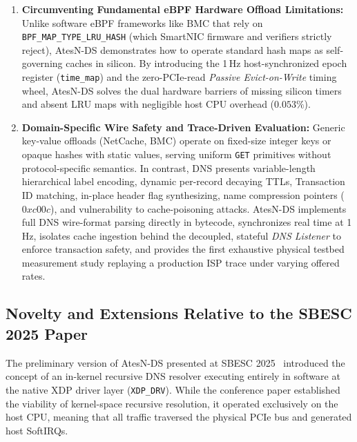 \documentclass[a4paper,fleqn,colorlinks,hidelinks]{cas-sc}
\begin{document}
\begin{enumerate}
    \item \textbf{Circumventing Fundamental eBPF Hardware Offload Limitations:} Unlike software eBPF frameworks like BMC that rely on \texttt{BPF\_MAP\_TYPE\_LRU\_HASH} (which SmartNIC firmware and verifiers strictly reject), AtesN-DS demonstrates how to operate standard hash maps as self-governing caches in silicon. By introducing the 1\,Hz host-synchronized epoch register (\texttt{time\_map}) and the zero-PCIe-read \textit{Passive Evict-on-Write} timing wheel, AtesN-DS solves the dual hardware barriers of missing silicon timers and absent LRU maps with negligible host CPU overhead ($0.053\%$).
    \item \textbf{Domain-Specific Wire Safety and Trace-Driven Evaluation:} Generic key-value offloads (NetCache, BMC) operate on fixed-size integer keys or opaque hashes with static values, serving uniform \texttt{GET} primitives without protocol-specific semantics. In contrast, DNS presents variable-length hierarchical label encoding, dynamic per-record decaying TTLs, Transaction ID matching, in-place header flag synthesizing, name compression pointers ($0xc00c$), and vulnerability to cache-poisoning attacks. AtesN-DS implements full DNS wire-format parsing directly in bytecode, synchronizes real time at 1\,Hz, isolates cache ingestion behind the decoupled, stateful \textit{DNS Listener} to enforce transaction safety, and provides the first exhaustive physical testbed measurement study replaying a production ISP trace under varying offered rates.
\end{enumerate}

\subsection{Novelty and Extensions Relative to the SBESC 2025 Paper}
\label{sec:novelty_sbesc}

The preliminary version of AtesN-DS presented at SBESC 2025~\citep{sbesc_estendido} introduced the concept of an in-kernel recursive DNS resolver executing entirely in software at the native XDP driver layer (\texttt{XDP\_DRV}). While the conference paper established the viability of kernel-space recursive resolution, it operated exclusively on the host CPU, meaning that all traffic traversed the physical PCIe bus and generated host SoftIRQs. 
\end{document}
